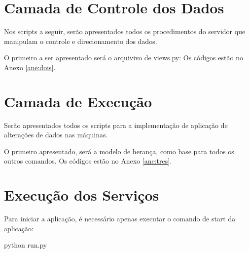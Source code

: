         

    \section{Camada de Controle dos Dados}
{\color{black}
    Nos scripts a seguir, ser\~ao apresentados todos os procedimentos do servidor que manipulam o controle e direcionamento
        dos dados.}

{\color{black}
    O primeiro a ser apresentado ser\'a o arquivivo de views.py:}
Os códigos estão no Anexo \ref{ane:dois}.

    \section{Camada de Execu\c{c}\~ao}
{\color{black}
    Ser\~ao apresentados todos os scripts para a implementa\c{c}\~ao de aplica\c{c}\~ao de altera\c{c}\~oes de dados nas
        m\'aquinas.}

{\color{black}
    O primeiro apresentado, ser\'a a modelo de heran\c{c}a, como base para todos os outros comandos.}
Os códigos estão no Anexo \ref{ane:tres}.

    \section{Execu\c{c}\~ao dos Servi\c{c}os}
{\color{black}
    Para iniciar a aplica\c{c}\~ao, \'e necess\'ario apenas executar o comando de start da aplica\c{c}\~ao:}

{\ttfamily\color[rgb]{0.10980392,0.10980392,0.10980392}
    python run.py}
